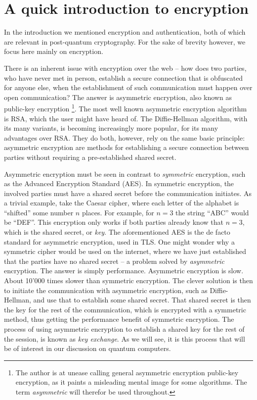 \documentclass[conference]{IEEEtran}
\begin{document}
\section{A quick introduction to encryption}
In the introduction we mentioned encryption and authentication, both of which are relevant in post-quantum cryptography.
For the sake of brevity however, we focus here mainly on encryption.

There is an inherent issue with encryption over the web -- how does two parties, who have never met in person, establish a secure connection that is obfuscated for anyone else, when the establishment of such communication must happen over open communication?
The answer is asymmetric encryption, also known as public-key encryption
\footnote{The author is at unease calling general asymmetric encryption public-key encryption, as it paints a misleading mental image for some algorithms. The term \emph{asymmetric} will therefor be used throughout.}.
The most well known asymmetric encryption algorithm is RSA, which the user might have heard of.
The Diffie-Hellman algorithm, with its many variants, is becoming increasingly more popular, for its many advantages over RSA.
They do both, however, rely on the same basic principle: asymmetric encryption are methods for establishing a secure connection between parties without requiring a pre-established shared secret.

Asymmetric encryption must be seen in contrast to \emph{symmetric} encryption, such as the Advanced Encryption Standard (AES).
In symmetric encryption, the involved parties must have a shared secret before the communication initiates.
As a trivial example, take the Caesar cipher, where each letter of the alphabet is ``shifted'' some number $n$ places.
For example, for $n=3$ the string ``ABC'' would be ``DEF''.
This encryption only works if both parties already know that $n=3$, which is the shared secret, or \emph{key}.
The aforementioned AES is the de facto standard for asymmetric encryption, used in TLS.
One might wonder why a symmetric cipher would be used on the internet, where we have just established that the parties have no shared secret -- a problem solved by \emph{asymmetric} encryption.
The answer is simply performance.
Asymmetric encryption is slow.
About 10'000 times slower than symmetric encryption.
The clever solution is then to initiate the communication with asymmetric encryption, such as Diffie-Hellman, and use that to establish some shared secret.
That shared secret is then the key for the rest of the communication, which is encrypted with a symmetric method, thus getting the performance benefit of symmetric encryption.
The process of using asymmetric encryption to establish a shared key for the rest of the session, is known as \emph{key exchange}.
As we will see, it is this process that will be of interest in our discussion on quantum computers.
\end{document}
